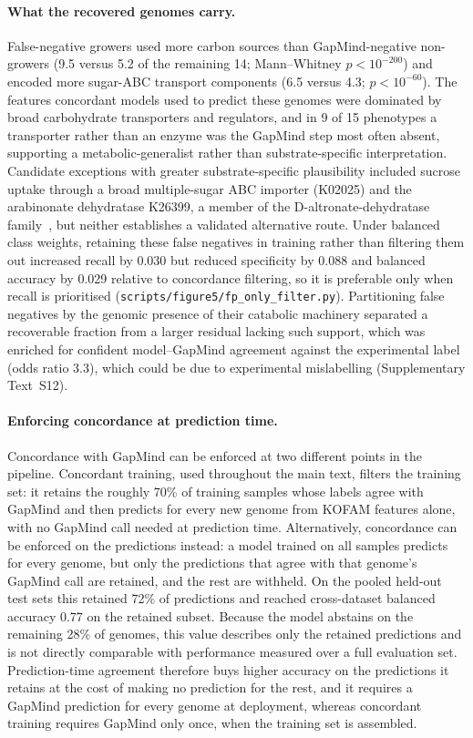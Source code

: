 \paragraph{What the recovered genomes carry.}
False-negative growers used more carbon sources than GapMind-negative non-growers (9.5 versus 5.2 of the remaining 14; Mann--Whitney $p<10^{-200}$) and encoded more sugar-ABC transport components (6.5 versus 4.3; $p<10^{-60}$).
The features concordant models used to predict these genomes were dominated by broad carbohydrate transporters and regulators, and in 9 of 15 phenotypes a transporter rather than an enzyme was the GapMind step most often absent, supporting a metabolic-generalist rather than substrate-specific interpretation.
Candidate exceptions with greater substrate-specific plausibility included sucrose uptake through a broad multiple-sugar ABC importer (K02025) and the arabinonate dehydratase K26399, a member of the D-altronate-dehydratase family~\cite{Watanabe2019Pentose,Watanabe2019Altronate}, but neither establishes a validated alternative route.
Under balanced class weights, retaining these false negatives in training rather than filtering them out increased recall by 0.030 but reduced specificity by 0.088 and balanced accuracy by 0.029 relative to concordance filtering, so it is preferable only when recall is prioritised (\texttt{scripts/figure5/fp\_only\_filter.py}).
Partitioning false negatives by the genomic presence of their catabolic machinery separated a recoverable fraction from a larger residual lacking such support, which was enriched for confident model--GapMind agreement against the experimental label (odds ratio 3.3), which could be due to experimental mislabelling (Supplementary Text~S12).

\paragraph{Enforcing concordance at prediction time.}
Concordance with GapMind can be enforced at two different points in the pipeline.
Concordant training, used throughout the main text, filters the training set: it retains the roughly 70\% of training samples whose labels agree with GapMind and then predicts for every new genome from KOFAM features alone, with no GapMind call needed at prediction time.
Alternatively, concordance can be enforced on the predictions instead: a model trained on all samples predicts for every genome, but only the predictions that agree with that genome's GapMind call are retained, and the rest are withheld.
On the pooled held-out test sets this retained 72\% of predictions and reached cross-dataset balanced accuracy 0.77 on the retained subset.
Because the model abstains on the remaining 28\% of genomes, this value describes only the retained predictions and is not directly comparable with performance measured over a full evaluation set.
Prediction-time agreement therefore buys higher accuracy on the predictions it retains at the cost of making no prediction for the rest, and it requires a GapMind prediction for every genome at deployment, whereas concordant training requires GapMind only once, when the training set is assembled.


